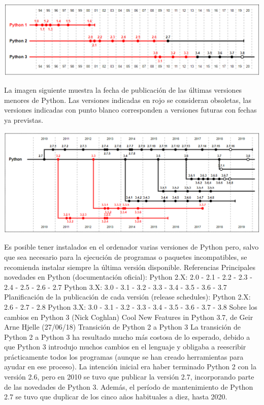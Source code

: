 \documentclass[12pt]{article}
\begin{document}
\includegraphics[width=\textwidth]{unnamed (7).png}

La imagen siguiente muestra la fecha de publicación de las últimas versiones menores de Python. Las versiones indicadas en rojo se consideran obsoletas, las versiones indicadas con punto blanco corresponden a versiones futuras con fechas ya previstas.

\includegraphics[width=\textwidth]{unnamed (8).png}

Es posible tener instalados en el ordenador varias versiones de Python pero, salvo que sea necesario para la ejecución de programas o paquetes incompatibles, se recomienda instalar siempre la última versión disponible.
Referencias
Principales novedades en Python (documentación oficial):
Python 2.X: 2.0 - 2.1 - 2.2 - 2.3 - 2.4 - 2.5 - 2.6 - 2.7
Python 3.X: 3.0 - 3.1 - 3.2 - 3.3 - 3.4 - 3.5 - 3.6 - 3.7
Planificación de la publicación de cada versión (release schedules):
Python 2.X: 2.6 - 2.7 - 2.8
Python 3.X: 3.0 - 3.1 - 3.2 - 3.3 - 3.4 - 3.5 - 3.6 - 3.7 - 3.8
Sobre los cambios en Python 3 (Nick Coghlan)
Cool New Features in Python 3.7, de Geir Arne Hjelle (27/06/18)
Transición de Python 2 a Python 3
La transición de Python 2 a Python 3 ha resultado mucho más costosa de lo esperado, debido a que Python 3 introdujo muchos cambios en el lenguaje y obligaba a reescribir prácticamente todos los programas (aunque se han creado herramientas para ayudar en ese proceso).
La intención inicial era haber terminado Python 2 con la versión 2.6, pero en 2010 se tuvo que publicar la versión 2.7, incorporando parte de las novedades de Python 3. Además, el período de mantenimiento de Python 2.7 se tuvo que duplicar de los cinco años habituales a diez, hasta 2020.
\end{document}
